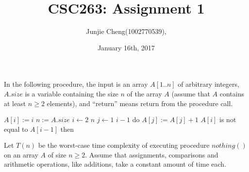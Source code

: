 \documentclass[11pt, answers]{exam}
\theoremstyle{plain}
\theoremstyle{definition}
\begin{document}
 


\title{CSC263: Assignment 1}
\date{January 16th, 2017}
\author{Junjie Cheng(1002770539),}
\maketitle

\unframedsolutions

\begin{questions}

\question

In the following procedure, the input is an array $A[1..n]$ of arbitrary integers, $A.size$ is a variable containing the size $n$ of the array $A$ (assume that $A$ contains at least $n \ge 2$ elements), and “return” means return from the procedure call.

\begin{codebox}
\li $A[i] := i$
\li $n := A.size$
\li \For $i \gets 2$ \To $n$ \Do
\li 	\For $j \gets 1$ \To $i-1$ do $A[j] := A[j]+1$
\li		\If $A[i]$ is not equal to $A[i-1]$ then \Return \End 
		\End 
	\End
\li \Return
\end{codebox}

Let $T(n)$ be the worst-case time complexity of executing procedure $nothing()$ on an array $A$ of size $n \ge 2$. Assume that assignments, comparisons and arithmetic operations, like additions, take a constant amount of time each.




\end{questions}
\end{document}
